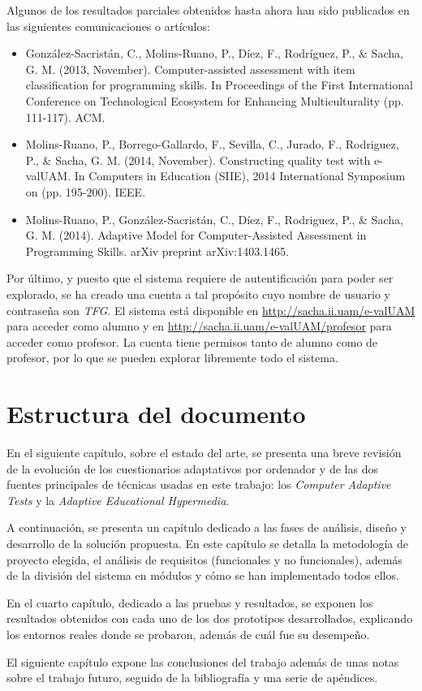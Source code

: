 Algunos de los resultados parciales obtenidos hasta ahora han sido publicados en las siguientes comunicaciones o artículos:

\begin{itemize}
	\item González-Sacristán, C., Molins-Ruano, P., Díez, F., Rodríguez, P., & Sacha, G. M. (2013, November). Computer-assisted assessment with item classification for programming skills. In Proceedings of the First International Conference on Technological Ecosystem for Enhancing Multiculturality (pp. 111-117). ACM.
	\item Molins-Ruano, P., Borrego-Gallardo, F., Sevilla, C., Jurado, F., Rodriguez, P., & Sacha, G. M. (2014, November). Constructing quality test with e-valUAM. In Computers in Education (SIIE), 2014 International Symposium on (pp. 195-200). IEEE.
	\item Molins-Ruano, P., González-Sacristán, C., Díez, F., Rodriguez, P., & Sacha, G. M. (2014). Adaptive Model for Computer-Assisted Assessment in Programming Skills. arXiv preprint arXiv:1403.1465.
\end{itemize}

Por último, y puesto que el sistema requiere de autentificación para poder ser explorado, se ha creado una cuenta a tal propósito cuyo nombre de usuario y contraseña son \textit{TFG}. El sistema está disponible en \url{http://sacha.ii.uam/e-valUAM} para acceder como alumno y en \url{http://sacha.ii.uam/e-valUAM/profesor} para acceder como profesor. La cuenta tiene permisos tanto de alumno como de profesor, por lo que se pueden explorar libremente todo el sistema.

\section{Estructura del documento}

En el siguiente capítulo, sobre el estado del arte, se presenta una breve revisión de la evolución de los cuestionarios adaptativos por ordenador y de las dos fuentes principales de técnicas usadas en este trabajo: los \textit{Computer Adaptive Tests} y la \textit{Adaptive Educational Hypermedia}.

A continuación, se presenta un capítulo dedicado a las fases de análisis, diseño y desarrollo de la solución propuesta. En este capítulo se detalla la metodología de proyecto elegida, el análisis de requisitos (funcionales y no funcionales), además de la división del sistema en módulos y cómo se han implementado todos ellos.

En el cuarto capítulo, dedicado a las pruebas y resultados, se exponen los resultados obtenidos con cada uno de los dos prototipos desarrollados, explicando los entornos reales donde se probaron, además de cuál fue su desempeño.

El siguiente capítulo expone las conclusiones del trabajo además de unas notas sobre el trabajo futuro, seguido de la bibliografía y una serie de apéndices. %

